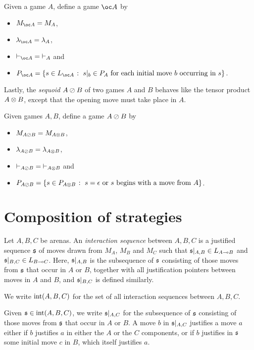 \documentclass[11pt]{report}
\begin{document}
\begin{definition}
  Given a game $A$, define a game $\oc A$ by
  \begin{itemize}
    \item $M_{\oc A}=M_A$,
    \item $\lambda_{\oc A} = \lambda_A$,
    \item $\ts_{\oc A} = \ts_A$ and
    \item $P_{\oc A} = \{s\in L_{\oc A} \suchthat \text{$s\vert_b\in P_A$ for each initial move $b$ occurring in $s$}\}$.
  \end{itemize}
\end{definition}

Lastly, the \emph{sequoid} $A\oslash B$ of two games $A$ and $B$ behaves like the tensor product $A\otimes B$, except that the opening move must take place in $A$.

\begin{definition}
  Given games $A,B$, define a game $A\oslash B$ by
  \begin{itemize}
    \item $M_{A\oslash B} = M_{A\otimes B}$, 
    \item $\lambda_{A\oslash B} = \lambda_{A\otimes B}$, 
    \item $\mathbin{\vdash}_{A\oslash B} = \mathbin{\vdash}_{A \otimes B}$ and
    \item $P_{A\oslash B} = \{s\in P_{A\otimes B}\;\colon\;\text{$s=\epsilon$ or $s$ begins with a move from $A$}\}$.
  \end{itemize}
\end{definition}

\section{Composition of strategies}

\begin{definition}
  Let $A,B,C$ be arenas.  
  An \emph{interaction sequence} between $A,B,C$ is a justified sequence $\mathfrak s$ of moves drawn from $M_A$, $M_B$ and $M_C$ such that $\mathfrak s\vert_{A,B}\in L_{A\multimap B}$ and $\mathfrak s\vert_{B,C}\in L_{B\multimap C}$.  
  Here, $\mathfrak s\vert_{A,B}$ is the subsequence of $\mathfrak s$ consisting of those moves from $\mathfrak s$ that occur in $A$ or $B$, together with all justification pointers between moves in $A$ and $B$, and $\mathfrak s\vert_{B,C}$ is defined similarly.

  We write $\operatorname{int}(A,B,C)$ for the set of all interaction sequences between $A,B,C$.

  Given $\mathfrak s\in\operatorname{int}(A,B,C)$, we write $\mathfrak s\vert_{A,C}$ for the subsequence of $\mathfrak s$ consisting of those moves from $\mathfrak s$ that occur in $A$ or $B$.  
  A move $b$ in $\mathfrak s\vert_{A,C}$ justifies a move $a$ either if $b$ justifies $a$ in either the $A$ or the $C$ components, or if $b$ justifies in $\mathfrak s$ some initial move $c$ in $B$, which itself justifies $a$.
\end{definition}
\end{document}
